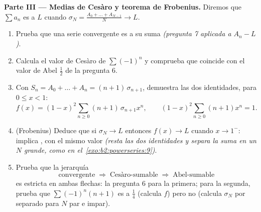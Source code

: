 \begin{problem}
\medskip
\noindent\textbf{Parte III --- Medias de Cesàro y teorema de
Frobenius.} Diremos que $\sum a_n$ es \emph{} a $L$
cuando $\sigma_N = \frac{A_0 + \dots + A_{N-1}}{N} \to L$.
\begin{enumerate}[resume]
  \item Prueba que una serie convergente es  a su suma
        \emph{(pregunta 7 aplicada a $A_n - L$)}.
  \item Calcula el valor de Cesàro de $\sum(-1)^n$ y comprueba que
        coincide con el valor de Abel $\frac12$ de la pregunta 6.
  \item Con $S_n = A_0 + \dots + A_n = (n+1)\,\sigma_{n+1}$,
        demuestra las dos identidades, para $0 \leq x < 1$:
        \[
        f(x) = (1-x)^2\sum_{n\geq0}(n+1)\,\sigma_{n+1}x^n,
        \qquad
        (1-x)^2\sum_{n\geq0}(n+1)x^n = 1 .
        \]
  \item (Frobenius) Deduce que si $\sigma_N \to L$ entonces $f(x)
        \to L$ cuando $x \to 1^-$:  implica
        , con el mismo valor \emph{(resta las dos
        identidades y separa la suma en un $N$ grande, como en el~\cref{exo:b2:powerseries:9})}.
  \item Prueba que la jerarquía
        \[
        \text{convergente} \;\Longrightarrow\;
        \text{Cesàro-sumable} \;\Longrightarrow\;
        \text{Abel-sumable}
        \]
        es estricta en ambas flechas: la pregunta 6 para la primera;
        para la segunda, prueba que $\sum(-1)^n(n+1)$ es
         a $\frac14$ (calcula $f$) pero no
         (calcula $\sigma_N$ por separado para $N$ par
        e impar).
\end{enumerate}


\end{problem}
